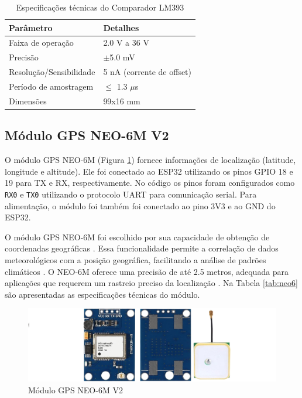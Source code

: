 \begin{table}[!htb]
  \caption{Especificações técnicas do Comparador LM393}
  \begin{tabularx}{\textwidth}{|X|X|} \hline
      \textbf{Parâmetro} & \textbf{Detalhes} \\ \hline
      Faixa de operação & 2.0 V a 36 V \\ \hline
      Precisão & $\pm$5.0 mV \\ \hline
      Resolução/Sensibilidade & 5 nA (corrente de offset) \\ \hline
      Período de amostragem & $\leq$ 1.3 $\mu$s \\ \hline
      Dimensões & 99x16 mm \\ \hline
  \end{tabularx}
  \label{tab:lm393}
\end{table}

\subsection{Módulo GPS NEO-6M V2}

O módulo GPS NEO-6M (Figura \ref{figura:neo6m}) fornece informações de localização (latitude, longitude e altitude). Ele foi conectado ao ESP32 utilizando os pinos GPIO 18 e 19 para TX e RX, respectivamente. No código os pinos foram configurados como \texttt{RX0} e \texttt{TX0} utilizando o protocolo UART para comunicação serial. Para alimentação, o módulo foi também foi conectado ao pino 3V3 e ao GND do ESP32.

O módulo GPS NEO-6M foi escolhido por sua capacidade de obtenção de coordenadas geográficas \parencite{NEO6M}. Essa funcionalidade permite a correlação de dados meteorológicos com a posição geográfica, facilitando a análise de padrões climáticos \parencite{Zhang_evapotranspiration_med2016}. O NEO-6M oferece uma precisão de até 2.5 metros, adequada para aplicações que requerem um rastreio preciso da localização \parencite{NEO6M}. Na Tabela \ref{tab:neo6} são apresentadas as especificações técnicas do módulo.

\begin{figure}[!htb] \centering
  \caption{Módulo GPS NEO-6M V2} \label{figura:neo6m}
  \begin{varwidth}{\linewidth}
    \includegraphics[width=16cm]{figuras/NEO6MV2.png}
  \end{varwidth}
\end{figure}

